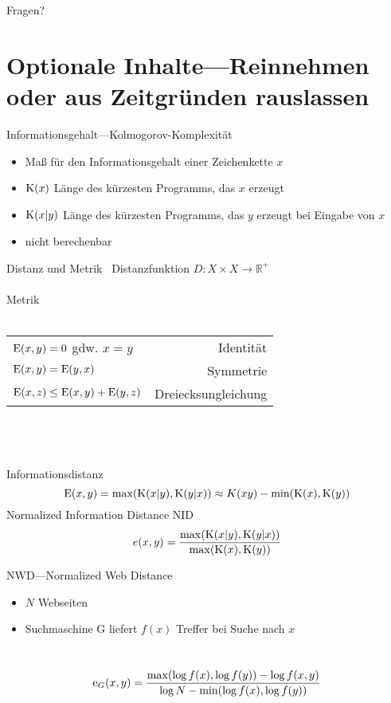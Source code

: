\documentclass[aspectratio=1610,handout]{beamer}
\newcommand{\K}[1]{\textnormal{K}{(#1)}}
\newcommand{\E}[1]{\textnormal{E}{(#1)}}
\newcommand{\D}[1]{\textnormal{E}{(#1)}}
\newcommand{\f}[1]{\ensuremath{f(#1)}}
\begin{document}
\begin{frame}{Fragen?}
\end{frame}

\section{Optionale Inhalte---Reinnehmen oder aus Zeitgründen rauslassen}

\begin{frame}{Informationsgehalt---Kolmogorov-Komplexität}
\begin{itemize}
\item Maß für den Informationsgehalt einer Zeichenkette $x$
\item $\K{x}$ Länge des kürzesten Programms, das $x$ erzeugt
\item $\K{x|y}$ Länge des kürzesten Programms, das $y$ erzeugt bei Eingabe von $x$
\item nicht berechenbar
\end{itemize}
\end{frame}

\begin{frame}{Distanz und Metrik~\cite{normalizedinformationdistance}}
Distanzfunktion $D: X \times  X \rightarrow \mathbb{R}^+$\\
\pause
~\\
Metrik\\~\\
\begin{tabular}{lr}
$\D{x,y} = 0$ gdw. $x = y$			&Identität\\
$\D{x,y} = \D{y,x}$					&Symmetrie\\
$\D{x,z} \leq \D{x,y} + \D{y,z}$	&Dreiecksungleichung\\
\end{tabular}\\
\pause
~\\~\\Informationsdistanz
\[\E{x,y} = \max(\K{x|y},\K{y|x}) \approx K(xy) - \min(\K{x},\K{y}) \]
\pause
Normalized Information Distance NID\\
\[e(x,y) = \frac{\max(\K{x|y},\K{y|x})}{\max(\K{x},\K{y})} \]
\end{frame}

\begin{frame}{NWD---Normalized Web Distance}
\begin{itemize}
\item $N$ Webseiten
\item Suchmaschine G liefert $\f{x}$ Treffer bei Suche nach $x$
\end{itemize}
~\\
\[\textnormal{e}_G(x,y) = \frac
{\max(\log \f{x}, \log \f{y})- \log \f{x,y}}
{\log N - \min(\log \f{x}, \log \f{y})}
\]
\end{frame}
\end{document}
